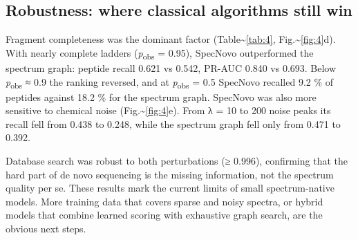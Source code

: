 \documentclass[pdflatex,sn-mathphys-num]{sn-jnl}
\begin{document}
\subsection{Robustness: where classical algorithms still win}

Fragment completeness was the dominant factor (Table\textasciitilde{}\ref{tab:4}, Fig.\textasciitilde{}\ref{fig:4}d). With nearly complete ladders (\emph{p}\textsubscript{obs} = 0.95), SpecNovo outperformed the spectrum graph: peptide recall 0.621 vs 0.542, PR-AUC 0.840 vs 0.693. Below \emph{p}\textsubscript{obs} ≈ 0.9 the ranking reversed, and at \emph{p}\textsubscript{obs} = 0.5 SpecNovo recalled 9.2 \% of peptides against 18.2 \% for the spectrum graph. SpecNovo was also more sensitive to chemical noise (Fig.\textasciitilde{}\ref{fig:4}e). From λ = 10 to 200 noise peaks its recall fell from 0.438 to 0.248, while the spectrum graph fell only from 0.471 to 0.392.

Database search was robust to both perturbations (≥ 0.996), confirming that the hard part of de novo sequencing is the missing information, not the spectrum quality per se. These results mark the current limits of small spectrum-native models. More training data that covers sparse and noisy spectra, or hybrid models that combine learned scoring with exhaustive graph search, are the obvious next steps.
\end{document}
